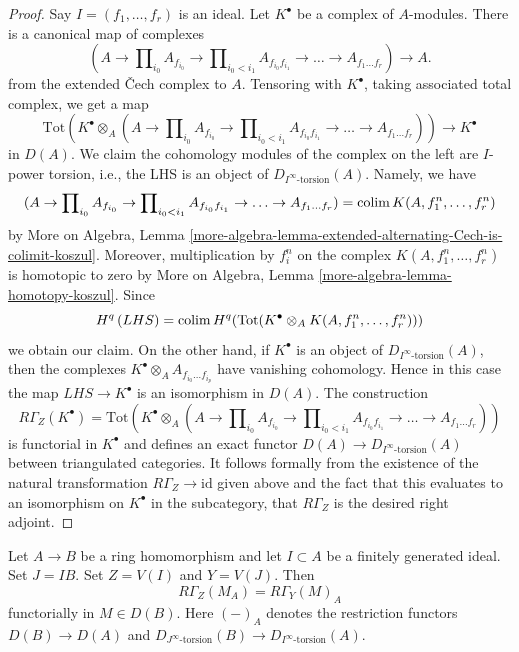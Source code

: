 \begin{proof}
Say $I = (f_1, \ldots, f_r)$ is an ideal.
Let $K^\bullet$ be a complex of $A$-modules.
There is a canonical map of complexes
$$
(A \to \prod\nolimits_{i_0} A_{f_{i_0}} \to
\prod\nolimits_{i_0 < i_1} A_{f_{i_0}f_{i_1}} \to
\ldots \to A_{f_1\ldots f_r}) \longrightarrow A.
$$
from the extended {\v C}ech complex to $A$.
Tensoring with $K^\bullet$, taking associated total complex,
we get a map
$$
\text{Tot}\left(
K^\bullet \otimes_A
(A \to \prod\nolimits_{i_0} A_{f_{i_0}} \to
\prod\nolimits_{i_0 < i_1} A_{f_{i_0}f_{i_1}} \to
\ldots \to A_{f_1\ldots f_r})\right)
\longrightarrow
K^\bullet
$$
in $D(A)$. We claim the cohomology modules of the complex on the left are
$I$-power torsion, i.e., the LHS is an object of
$D_{I^\infty\text{-torsion}}(A)$. Namely, we have
$$
(A \to \prod\nolimits_{i_0} A_{f_{i_0}} \to
\prod\nolimits_{i_0 < i_1} A_{f_{i_0}f_{i_1}} \to
\ldots \to A_{f_1\ldots f_r}) = \mathop{\mathrm{colim}}\nolimits K(A, f_1^n, \ldots, f_r^n)
$$
by More on Algebra, Lemma
\ref{more-algebra-lemma-extended-alternating-Cech-is-colimit-koszul}.
Moreover, multiplication by $f_i^n$ on the complex
$K(A, f_1^n, \ldots, f_r^n)$ is homotopic to zero by
More on Algebra, Lemma \ref{more-algebra-lemma-homotopy-koszul}.
Since
$$
H^q\left( LHS \right) =
\mathop{\mathrm{colim}}\nolimits H^q(\text{Tot}(K^\bullet \otimes_A K(A, f_1^n, \ldots, f_r^n)))
$$
we obtain our claim. On the other hand, if $K^\bullet$ is an
object of $D_{I^\infty\text{-torsion}}(A)$, then the complexes
$K^\bullet \otimes_A A_{f_{i_0} \ldots f_{i_p}}$ have vanishing
cohomology. Hence in this case the map $LHS \to K^\bullet$
is an isomorphism in $D(A)$. The construction
$$
R\Gamma_Z(K^\bullet) =
\text{Tot}\left(
K^\bullet \otimes_A
(A \to \prod\nolimits_{i_0} A_{f_{i_0}} \to
\prod\nolimits_{i_0 < i_1} A_{f_{i_0}f_{i_1}} \to
\ldots \to A_{f_1\ldots f_r})\right)
$$
is functorial in $K^\bullet$ and defines an exact functor
$D(A) \to D_{I^\infty\text{-torsion}}(A)$ between
triangulated categories. It follows formally from the
existence of the natural transformation $R\Gamma_Z \to \text{id}$
given above and the fact that this evaluates to an isomorphism
on $K^\bullet$ in the subcategory, that $R\Gamma_Z$ is the desired
right adjoint.
\end{proof}

\begin{lemma}
\label{lemma-local-cohomology-and-restriction}
Let $A \to B$ be a ring homomorphism and let $I \subset A$
be a finitely generated ideal. Set $J = IB$. Set $Z = V(I)$
and $Y = V(J)$. Then
$$
R\Gamma_Z(M_A) = R\Gamma_Y(M)_A
$$
functorially in $M \in D(B)$. Here $(-)_A$ denotes the restriction
functors $D(B) \to D(A)$ and
$D_{J^\infty\text{-torsion}}(B) \to D_{I^\infty\text{-torsion}}(A)$.
\end{lemma}

